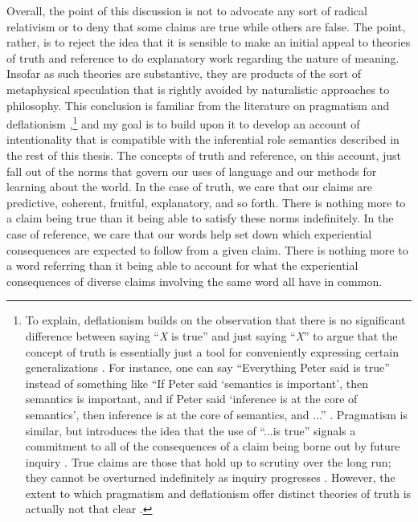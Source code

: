 Overall, the point of this discussion is not to advocate any sort of radical relativism or to deny that some claims are true while others are false. The point, rather, is to reject the idea that it is sensible to make an initial appeal to theories of truth and reference to do explanatory work regarding the nature of meaning. Insofar as such theories are substantive, they are products of the sort of metaphysical speculation that is rightly avoided by naturalistic approaches to philosophy. This conclusion is familiar from the literature on pragmatism and deflationism \citep[see, e.g.][]{Brandom:2000,Brandom:2009,Brandom:1994,Misak:2013,Misak:2007,Horwich:2005},\footnote{To explain, deflationism builds on the observation that there is no significant difference between saying ``\textit{X} is true'' and just saying ``\textit{X}'' to argue that the concept of truth is essentially just a tool for conveniently expressing certain generalizations \citep{Horwich:2005}. For instance, one can say ``Everything Peter said is true'' instead of something like ``If Peter said `semantics is important', then semantics is important, and if Peter said `inference is at the core of semantics', then inference is at the core of semantics, and ...'' \citep{Horwich:2005}. Pragmatism is similar, but introduces the idea that the use of ``...is true'' signals a commitment to all of the consequences of a claim being borne out by future inquiry \citep{Misak:2007,Misak:2013}. True claims are those that hold up to scrutiny over the long run; they cannot be overturned indefinitely as inquiry progresses \citep{Peirce:1992}. However, the extent to which pragmatism and deflationism offer distinct theories of truth is actually not that clear \citep{Misak:2007}.} and my goal is to build upon it to develop an account of intentionality that is compatible with the inferential role semantics described in the rest of this thesis. The concepts of truth and reference, on this account, just fall out of the norms that govern our uses of language and our methods for learning about the world. In the case of truth, we care that our claims are predictive, coherent, fruitful, explanatory, and so forth. There is nothing more to a claim being true than it being able to satisfy these norms indefinitely. In the case of reference, we care that our words help set down which experiential consequences are expected to follow from a given claim. There is nothing more to a word referring than it being able to account for what the experiential consequences of diverse claims involving the same word all have in common. 

